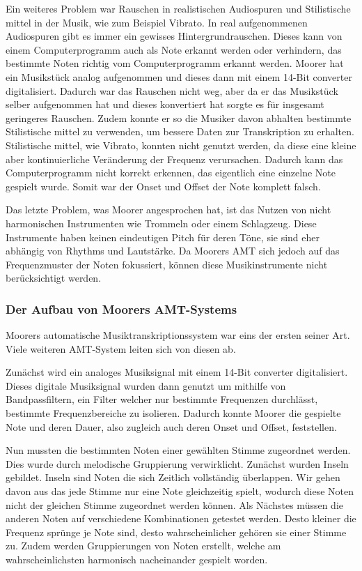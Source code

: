 Ein weiteres Problem war Rauschen in realistischen Audiospuren und
Stilistische mittel in der Musik, wie zum Beispiel Vibrato.
In real aufgenommenen Audiospuren gibt es immer ein gewisses Hintergrundrauschen.
\cite{iZotope2025noisefloor}
Dieses kann von einem Computerprogramm auch als Note erkannt werden oder verhindern, das bestimmte Noten
richtig vom Computerprogramm erkannt werden.
Moorer hat ein Musikstück analog aufgenommen und dieses dann mit einem 14-Bit converter digitalisiert.
Dadurch war das Rauschen nicht weg, aber da er das Musikstück selber aufgenommen hat und dieses konvertiert hat
sorgte es für insgesamt geringeres Rauschen.
Zudem konnte er so die Musiker davon abhalten bestimmte Stilistische mittel zu verwenden,
um bessere Daten zur Transkription zu erhalten.
Stilistische mittel, wie Vibrato, konnten nicht genutzt werden,
da diese eine kleine aber kontinuierliche Veränderung der Frequenz verursachen.
Dadurch kann das Computerprogramm nicht korrekt erkennen, das eigentlich eine einzelne Note gespielt wurde.
Somit war der Onset und Offset der Note komplett falsch.

Das letzte Problem, was Moorer angesprochen hat, ist das Nutzen von nicht
harmonischen Instrumenten wie Trommeln oder einem Schlagzeug.
Diese Instrumente haben keinen eindeutigen Pitch für deren Töne,
sie sind eher abhängig von Rhythms und Lautstärke.
Da Moorers AMT sich jedoch auf das Frequenzmuster der Noten fokussiert,
können diese Musikinstrumente nicht berücksichtigt werden.

\subsubsection{Der Aufbau von Moorers AMT-Systems}
Moorers automatische Musiktranskriptionssystem war eins der ersten seiner Art.
Viele weiteren AMT-System leiten sich von diesen ab.

Zunächst wird ein analoges Musiksignal mit einem 14-Bit converter digitalisiert.
Dieses digitale Musiksignal wurden dann genutzt um mithilfe von Bandpassfiltern,
ein Filter welcher nur bestimmte Frequenzen durchlässt,
bestimmte Frequenzbereiche zu isolieren.
Dadurch konnte Moorer die gespielte Note und deren Dauer,
also zugleich auch deren Onset und Offset, feststellen.

Nun mussten die bestimmten Noten einer gewählten Stimme zugeordnet werden.
Dies wurde durch melodische Gruppierung verwirklicht.
Zunächst wurden Inseln gebildet.
Inseln sind Noten die sich Zeitlich vollständig überlappen.
Wir gehen davon aus das jede Stimme nur eine Note gleichzeitig spielt,
wodurch diese Noten nicht der gleichen Stimme zugeordnet werden können.
Als Nächstes müssen die anderen Noten auf verschiedene Kombinationen getestet werden.
Desto kleiner die Frequenz sprünge je Note sind, desto wahrscheinlicher gehören sie einer Stimme zu.
Zudem werden Gruppierungen von Noten erstellt, welche am wahrscheinlichsten harmonisch nacheinander gespielt worden.

